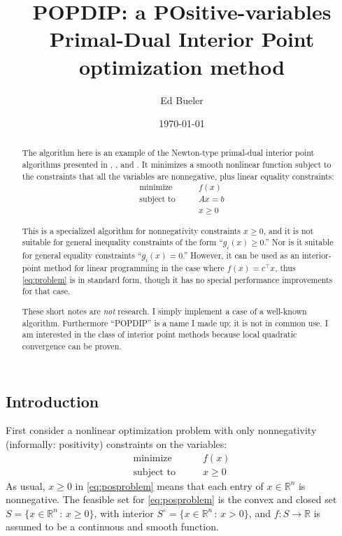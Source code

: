 \documentclass[11pt]{article}
\title{POPDIP: a POsitive-variables \\ Primal-Dual Interior Point optimization method}
\author{Ed Bueler}
\date{\today}
\newcommand{\RR}{\mathbb{R}}
\begin{document}
\maketitle

\begin{abstract}
The algorithm here is an example of the Newton-type primal-dual interior point algorithms presented in \cite[section 16.7]{GrivaNashSofer2009}, \cite[chapter 19]{NocedalWright2006}, and \cite{YamashitaYabe1996}.  It minimizes a smooth nonlinear function subject to the constraints that all the variables are nonnegative, plus linear equality constraints:
\begin{equation}
\begin{matrix}
\text{minimize} \qquad   & f(x) \\
\text{subject to} \qquad & A x = b \\
                         & x \ge 0
\end{matrix} \label{eq:problem}
\end{equation}

This is a specialized algorithm for nonnegativity constraints $x\ge 0$, and it is not suitable for general inequality constraints of the form ``$g_i(x)\ge 0$.''  Nor is it suitable for general equality constraints ``$g_i(x)=0$.''  However, it can be used as an interior-point method for linear programming in the case where $f(x)=c^\top x$, thus \eqref{eq:problem} is in standard form, though it has no special performance improvements for that case.

These short notes are \emph{not} research.  I simply implement a case of a well-known algorithm.  Furthermore ``POPDIP'' is a name I made up; it is not in common use.  I am interested in the class of interior point methods because local quadratic convergence can be proven.
\end{abstract}

\thispagestyle{empty}

\bigskip
\subsection*{Introduction}

First consider a nonlinear optimization problem with only nonnegativity (informally: positivity) constraints on the variables:
\begin{equation}
\begin{matrix}
\text{minimize} \qquad & f(x) \\
\text{subject to} \qquad & x \ge 0
\end{matrix} \label{eq:posproblem}
\end{equation}
As usual, $x\ge 0$ in \eqref{eq:posproblem} means that each entry of $x\in\RR^n$ is nonnegative.  The feasible set for \eqref{eq:posproblem} is the convex and closed set $S = \{x\in \RR^n\,:\,x\ge 0\}$, with interior $S^\circ = \{x\in \RR^n\,:\,x > 0\}$, and $f:S \to \RR$ is assumed to be a continuous and smooth function.
\end{document}
